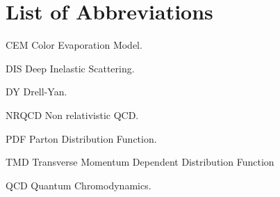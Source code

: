 \chapter{List of Abbreviations}

\begin{abbrevlist}
	\item[CEM] Color Evaporation Model.
	\item[DIS] Deep Inelastic Scattering.
	\item[DY] Drell-Yan.
	\item[NRQCD] Non relativistic QCD.
	\item[PDF] Parton Distribution Function.
	\item[TMD] Transverse Momentum Dependent Distribution Function
	\item[QCD] Quantum Chromodynamics.
\end{abbrevlist}

